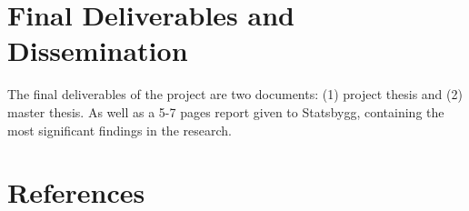 \section*{Final Deliverables and Dissemination}

The final deliverables of the project are two documents: (1) project thesis and (2) master thesis. As well as a 5-7 pages report given to Statsbygg, containing the most significant findings in the research. 

\section*{References}
\renewcommand{\bibsection}{ }









